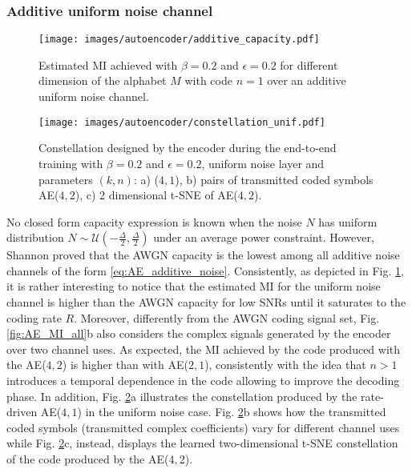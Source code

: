 \subsubsection{Additive uniform noise channel}
\begin{figure}
	\centering
	\texttt{[image: images/autoencoder/additive\_capacity.pdf]}
	\caption{Estimated MI achieved with $\beta=0.2$ and $\epsilon=0.2$ for different dimension of the alphabet $M$ with code $n=1$ over an additive uniform noise channel.}
	\label{fig:AE_additive_capacity}
\end{figure}

\begin{figure}
	\centering
	\texttt{[image: images/autoencoder/constellation\_unif.pdf]}
	\caption{Constellation designed by the encoder during the end-to-end training with $\beta=0.2$ and $\epsilon=0.2$, uniform noise layer and parameters $(k,n)$: a) ($4,1$), b) pairs of transmitted coded symbols AE($4,2$), c) 2 dimensional t-SNE of AE($4,2$).}
	\label{fig:AE_constellation_unif}
\end{figure}

No closed form capacity expression is known when the noise $N$ has uniform distribution $N\sim \mathcal{U}(-\frac{\Delta}{2},\frac{\Delta}{2})$ under an average power constraint. However, Shannon proved that the AWGN capacity is the lowest among all additive noise channels of the form \eqref{eq:AE_additive_noise}. Consistently, as depicted in Fig. \ref{fig:AE_additive_capacity}, it is rather interesting to notice that the estimated MI for the uniform noise channel is higher than the AWGN capacity for low SNRs until it saturates to the coding rate $R$. 
Moreover, differently from the AWGN coding signal set, Fig. \ref{fig:AE_MI_all}b also considers the complex signals generated by the encoder over two channel uses. As expected, the MI achieved by the code produced with the AE($4,2$) is higher than with AE($2,1$), consistently with the idea that $n>1$ introduces a temporal dependence in the code allowing to improve the decoding phase. In addition, Fig. \ref{fig:AE_constellation_unif}a illustrates the constellation produced by the rate-driven AE($4,1$) in the uniform noise case. Fig. \ref{fig:AE_constellation_unif}b shows how the transmitted coded symbols (transmitted complex coefficients) vary for different channel uses while Fig. \ref{fig:AE_constellation_unif}c, instead, displays the learned two-dimensional t-SNE constellation of the code produced by the AE($4,2$). 

